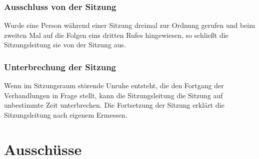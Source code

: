 \documentclass{article}
\begin{document}
\section{Ausschluss von der Sitzung}
Wurde eine Person während einer Sitzung dreimal zur Ordnung gerufen und beim zweiten Mal auf die Folgen eins dritten Rufes hingewiesen, so schließt die Sitzungsleitung sie von der Sitzung aus.

\section{Unterbrechung der Sitzung}
Wenn im Sitzungsraum störende Unruhe entsteht, die den Fortgang der Verhandlungen in Frage stellt, kann die Sitzungsleitung die Sitzung auf unbestimmte Zeit unterbrechen. 
Die Fortsetzung der Sitzung erklärt die Sitzungsleitung nach eigenem Ermessen.

\part{Ausschüsse}
\end{document}
